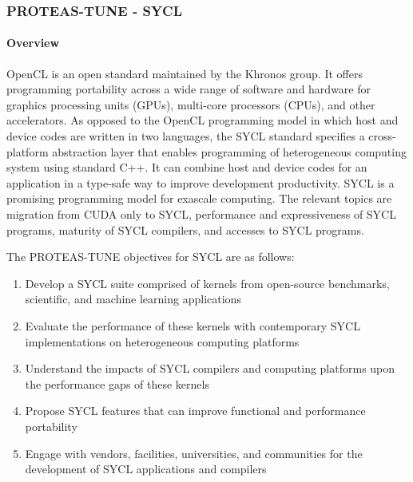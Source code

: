 \subsubsection{ PROTEAS-TUNE - SYCL}\label{s:sycl}

\paragraph{Overview}
OpenCL is an open standard maintained by the Khronos group. It offers programming portability across a wide range of software and hardware for graphics processing units (GPUs), multi-core processors (CPUs), and other accelerators. As opposed to the OpenCL programming model in which host and device codes are written in two languages, the SYCL standard specifies a cross-platform abstraction layer that enables programming of heterogeneous computing system using standard C++. It can combine host and device codes for an application in a type-safe way to improve development productivity. SYCL is a promising programming model for exascale computing. The relevant topics are migration from CUDA only to SYCL, performance and expressiveness of SYCL programs, maturity of SYCL compilers, and accesses to SYCL programs.


The PROTEAS-TUNE objectives for SYCL are as follows:
\begin{enumerate}
\item Develop a SYCL suite comprised of kernels from open-source benchmarks, scientific, and machine learning applications
\item Evaluate the performance of these kernels with contemporary SYCL implementations on heterogeneous computing platforms
\item Understand the impacts of SYCL compilers and computing platforms upon the performance gaps of these kernels
\item Propose SYCL features that can improve functional and performance portability 
\item Engage with vendors, facilities, universities, and communities for the development of SYCL applications and compilers
\end{enumerate}

 

